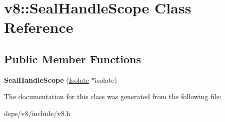 \hypertarget{classv8_1_1_seal_handle_scope}{}\section{v8\+:\+:Seal\+Handle\+Scope Class Reference}
\label{classv8_1_1_seal_handle_scope}
\subsection*{Public Member Functions}
\begin{DoxyCompactItemize}
\item 
\hypertarget{classv8_1_1_seal_handle_scope_acfdab75cc53b53d3ba1a50ab5f4fe16e}{}{\bfseries Seal\+Handle\+Scope} (\hyperlink{classv8_1_1_isolate}{Isolate} $\ast$isolate)\label{classv8_1_1_seal_handle_scope_acfdab75cc53b53d3ba1a50ab5f4fe16e}

\end{DoxyCompactItemize}


The documentation for this class was generated from the following file\+:\begin{DoxyCompactItemize}
\item 
deps/v8/include/v8.\+h\end{DoxyCompactItemize}
